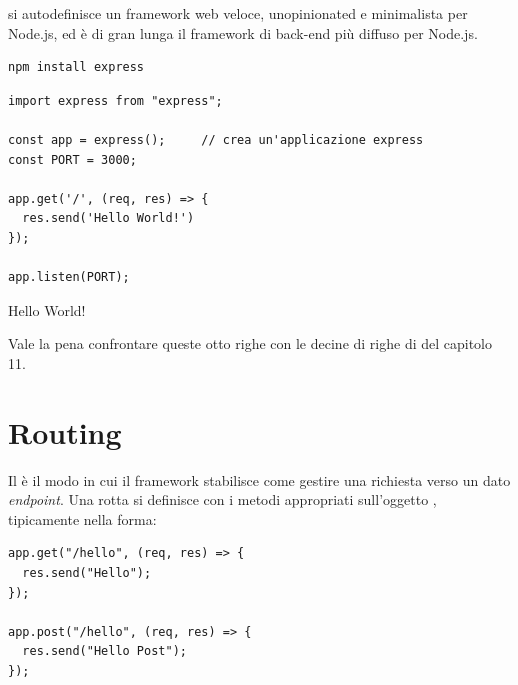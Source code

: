  si autodefinisce un \guillemotleft framework web veloce, unopinionated e
minimalista per Node.js\guillemotright, ed è di gran lunga il framework di back-end più
diffuso per Node.js.

\begin{lstlisting}[style=shell]
npm install express
\end{lstlisting}

\begin{affianco}[0.55][c]
\begin{lstlisting}[style=js, name=index.js]
import express from "express";

const app = express();     // crea un'applicazione express
const PORT = 3000;

app.get('/', (req, res) => {
  res.send('Hello World!')
});

app.listen(PORT);
\end{lstlisting}
\risultato
\begin{browser}[localhost:3000]
  Hello World!
\end{browser}
\end{affianco}

Vale la pena confrontare queste otto righe con le decine di righe di
 del capitolo 11.

\section{Routing}

Il  è il modo in cui il framework stabilisce come gestire una
richiesta verso un dato \textit{endpoint}. Una rotta si definisce con i metodi
appropriati sull'oggetto , tipicamente nella forma:

\begin{center}
\end{center}

\begin{affianco}[0.5][c]
\begin{lstlisting}[style=js]
app.get("/hello", (req, res) => {
  res.send("Hello");
});

app.post("/hello", (req, res) => {
  res.send("Hello Post");
});
\end{lstlisting}
\risultato
\begin{immagine}
\end{immagine}
\end{affianco}

